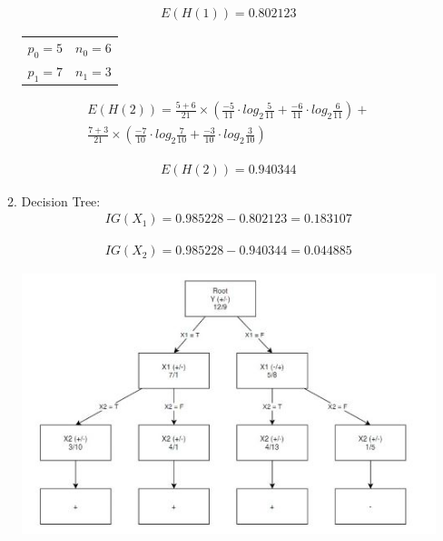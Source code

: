 \documentclass[12pt]{article}
\begin{document}
\begin{enumerate}
\begin{enumerate}
			\begin{equation}
				\begin{split}
					E(H(1)) = 0.802123
				\end{split}
			\end{equation}
		
		
		\begin{tabular}{ c c}
			$p_0 = 5$ & $n_0 = 6$\\ 
			$p_1 = 7$ & $n_1 = 3$ 
		\end{tabular}
		
		
		\begin{equation}
			\begin{split}
				E(H(2)) = \frac {5+6}{21} \times (\frac{-5}{11} \cdot log_2 \frac{5}{11} + \frac{-6}{11} \cdot log_2 \frac{6}{11}) +\\
				\frac {7+3}{21} \times (\frac{-7}{10} \cdot log_2 \frac{7}{10} + \frac{-3}{10} \cdot log_2 \frac{3}{10})
			\end{split}
		\end{equation}
		
		\begin{equation}
			\begin{split}
				E(H(2)) = 0.940344
			\end{split}
		\end{equation}
			
			
			
			\item Decision Tree:\\
			
			\begin{equation}
				\begin{split}
					IG(X_1) = 0.985228 - 0.802123 = 0.183107
				\end{split}
			\end{equation}
		
			\begin{equation}
				\begin{split}
					IG(X_2) = 0.985228 - 0.940344 = 0.044885
				\end{split}
			\end{equation}
			
				\begin{center}
					\includegraphics{d_tree_01}
				\end{center}
			

\end{enumerate}
\end{enumerate}
\end{document}
